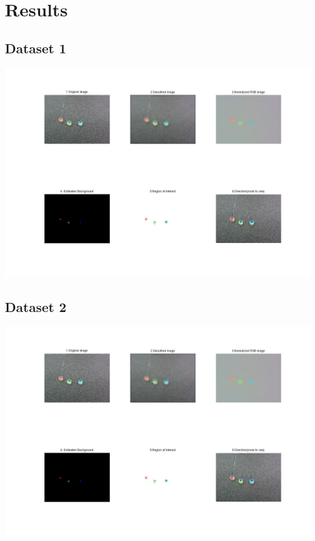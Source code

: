 \documentclass{report}
\begin{document}
\chapter{Results}   

\section{Dataset 1}
\includegraphics[scale=0.3]{example}

\section{Dataset 2}
\includegraphics[scale=0.3]{example}
\end{document}
